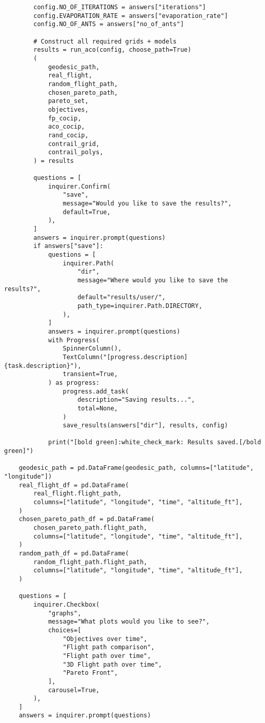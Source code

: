 \begin{verbatim}
        config.NO_OF_ITERATIONS = answers["iterations"]
        config.EVAPORATION_RATE = answers["evaporation_rate"]
        config.NO_OF_ANTS = answers["no_of_ants"]

        # Construct all required grids + models
        results = run_aco(config, choose_path=True)
        (
            geodesic_path,
            real_flight,
            random_flight_path,
            chosen_pareto_path,
            pareto_set,
            objectives,
            fp_cocip,
            aco_cocip,
            rand_cocip,
            contrail_grid,
            contrail_polys,
        ) = results

        questions = [
            inquirer.Confirm(
                "save",
                message="Would you like to save the results?",
                default=True,
            ),
        ]
        answers = inquirer.prompt(questions)
        if answers["save"]:
            questions = [
                inquirer.Path(
                    "dir",
                    message="Where would you like to save the results?",
                    default="results/user/",
                    path_type=inquirer.Path.DIRECTORY,
                ),
            ]
            answers = inquirer.prompt(questions)
            with Progress(
                SpinnerColumn(),
                TextColumn("[progress.description]{task.description}"),
                transient=True,
            ) as progress:
                progress.add_task(
                    description="Saving results...",
                    total=None,
                )
                save_results(answers["dir"], results, config)

            print("[bold green]:white_check_mark: Results saved.[/bold green]")

    geodesic_path = pd.DataFrame(geodesic_path, columns=["latitude", "longitude"])
    real_flight_df = pd.DataFrame(
        real_flight.flight_path,
        columns=["latitude", "longitude", "time", "altitude_ft"],
    )
    chosen_pareto_path_df = pd.DataFrame(
        chosen_pareto_path.flight_path,
        columns=["latitude", "longitude", "time", "altitude_ft"],
    )
    random_path_df = pd.DataFrame(
        random_flight_path.flight_path,
        columns=["latitude", "longitude", "time", "altitude_ft"],
    )

    questions = [
        inquirer.Checkbox(
            "graphs",
            message="What plots would you like to see?",
            choices=[
                "Objectives over time",
                "Flight path comparison",
                "Flight path over time",
                "3D Flight path over time",
                "Pareto Front",
            ],
            carousel=True,
        ),
    ]
    answers = inquirer.prompt(questions)


\end{verbatim}

